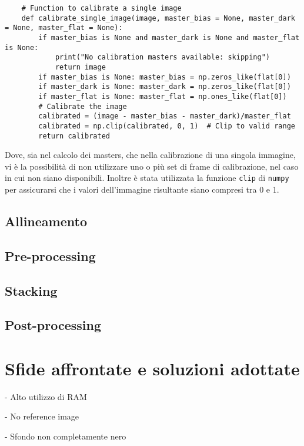 \begin{lstlisting}
    # Function to calibrate a single image
    def calibrate_single_image(image, master_bias = None, master_dark = None, master_flat = None):
        if master_bias is None and master_dark is None and master_flat is None:
            print("No calibration masters available: skipping")
            return image
        if master_bias is None: master_bias = np.zeros_like(flat[0])
        if master_dark is None: master_dark = np.zeros_like(flat[0])
        if master_flat is None: master_flat = np.ones_like(flat[0])
        # Calibrate the image
        calibrated = (image - master_bias - master_dark)/master_flat
        calibrated = np.clip(calibrated, 0, 1)  # Clip to valid range
        return calibrated
\end{lstlisting}
    
Dove, sia nel calcolo dei masters, che nella calibrazione di una singola immagine, vi è la possibilità di non utilizzare uno o più set di frame di calibrazione, nel caso in cui non siano disponibili.
Inoltre è stata utilizzata la funzione \texttt{clip} di \texttt{numpy} per assicurarsi che i valori dell'immagine risultante siano compresi tra 0 e 1.

\subsection{Allineamento} \label{subsec:alignment_impl}

\subsection{Pre-processing} \label{subsec:preprocessing_impl}

\subsection{Stacking} \label{subsec:stacking_impl}

\subsection{Post-processing} \label{subsec:postprocessing_impl}

\section{Sfide affrontate e soluzioni adottate} \label{sec:challenges}

- Alto utilizzo di RAM 

- No reference image

- Sfondo non completamente nero 



\cleardoublepage